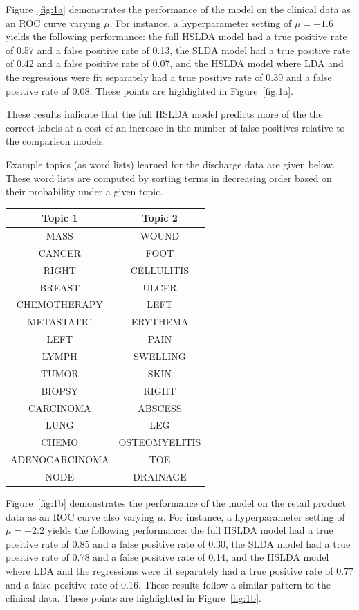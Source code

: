 Figure~\ref{fig:1a} demonstrates the performance of the model on the clinical data as an ROC curve varying $\mu$.  For instance, 
a hyperparameter setting of $\mu=-1.6$ yields the following performance:
the full HSLDA model had a 
true positive rate of 0.57 and a false positive rate of 0.13, the SLDA model
had a true positive rate of 0.42 and a false positive rate of 0.07, and the
HSLDA model where LDA and the regressions were fit separately had a true
positive rate of 0.39 and a false positive rate of 0.08. These points are highlighted in Figure~\ref{fig:1a}.

These results indicate that the full HSLDA model predicts more of the the
correct labels at a cost of an increase in the number of false positives
relative to the comparison models.


Example topics (as word lists) learned for the discharge data are given below.  These word lists are computed by sorting
terms in decreasing order based on their probability under a given topic.

\begin{extract}
\begin{tabular}{|c|c|}
\hline
\textbf{Topic 1} & \textbf{Topic 2} \\ \hline
MASS & WOUND \\
\hline
CANCER & FOOT \\
\hline
RIGHT & CELLULITIS \\
\hline
BREAST & ULCER \\
\hline
CHEMOTHERAPY & LEFT \\
\hline
METASTATIC & ERYTHEMA \\
\hline
LEFT & PAIN \\
\hline
LYMPH & SWELLING \\
\hline
TUMOR & SKIN \\
\hline
BIOPSY & RIGHT \\
\hline
CARCINOMA & ABSCESS \\
\hline
LUNG & LEG \\
\hline
CHEMO & OSTEOMYELITIS \\
\hline
ADENOCARCINOMA & TOE \\
\hline
NODE & DRAINAGE \\
\hline
\end{tabular}
\end{extract}

Figure~\ref{fig:1b} demonstrates the performance of the model on the retail product data as an ROC curve also varying $\mu$. For
instance, a hyperparameter setting of $\mu=-2.2$ yields the following
performance: the full HSLDA model had a true positive rate of 0.85 
and a false positive rate of 0.30, the SLDA model had a true positive
rate of 0.78 and a false positive rate of 0.14, and the HSLDA model where
LDA and the regressions were fit separately had a true positive rate of 0.77
and a false positive rate of 0.16. These results follow a similar pattern to the clinical data. These points are highlighted in Figure~\ref{fig:1b}.

